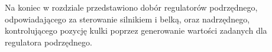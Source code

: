 Na koniec w rozdziale przedstawiono dobór regulatorów podrzędnego, odpowiadającego za sterowanie silnikiem i belką, oraz nadrzędnego, kontrolującego pozycję kulki poprzez generowanie wartości zadanych dla regulatora podrzędnego.

